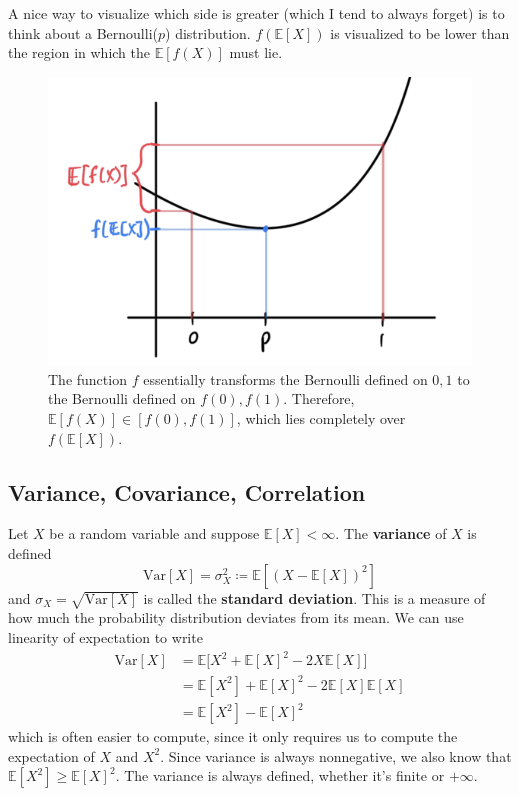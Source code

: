     A nice way to visualize which side is greater (which I tend to always forget) is to think about a Bernoulli($p$) distribution. $f(\mathbb{E}[X])$ is visualized to be lower than the region in which the $\mathbb{E}[f(X)]$ must lie. 

    \begin{figure}[H]
      \centering 
      \includegraphics[scale=0.4]{img/jensen_visual.png}
      \caption{The function $f$ essentially transforms the Bernoulli defined on $0, 1$ to the Bernoulli defined on $f(0), f(1)$. Therefore, $\mathbb{E}[f(X)] \in [f(0), f(1)]$, which lies completely over $f(\mathbb{E}[X])$.} 
      \label{fig:jensen_visual}
    \end{figure}

\subsection{Variance, Covariance, Correlation}

  \begin{definition}[Variance]
    Let $X$ be a random variable and suppose $\mathbb{E}[X] < \infty$. The \textbf{variance} of $X$ is defined 
    \begin{equation}
      \mathrm{Var}[X] = \sigma^2_X \coloneqq \mathbb{E} [ (X - \mathbb{E}[X])^2 ]
    \end{equation}
    and $\sigma_X = \sqrt{\mathrm{Var}[X]}$ is called the \textbf{standard deviation}. This is a measure of how much the probability distribution deviates from its mean. We can use linearity of expectation to write 
    \begin{align*}
      \mathrm{Var}[X] & = \mathbb{E} \big[ X^2 + \mathbb{E}[X]^2 - 2 X \mathbb{E}[X] \big] \\
      & = \mathbb{E}[X^2] + \mathbb{E}[X]^2 - 2 \mathbb{E}[X] \mathbb{E}[X] \\
      & = \mathbb{E}[X^2] - \mathbb{E}[X]^2
    \end{align*}
    which is often easier to compute, since it only requires us to compute the expectation of $X$ and $X^2$. Since variance is always nonnegative, we also know that $\mathbb{E}[X^2] \geq \mathbb{E}[X]^2$. The variance is always defined, whether it's finite or $+\infty$. 
  \end{definition}

